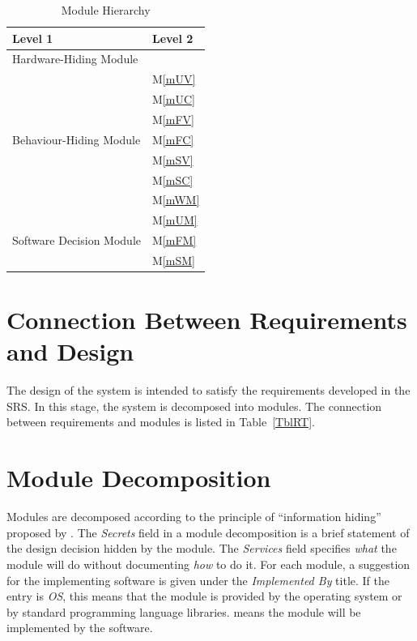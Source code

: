 \documentclass[12pt, titlepage]{article}
\newcommand{\mref}[1]{M\ref{#1}}
\begin{document}
\begin{table}[h!]
\centering
\begin{tabular}{p{} p{}}
\toprule
\textbf{Level 1} & \textbf{Level 2}\\
\midrule

{Hardware-Hiding Module} & ~ \\
\midrule

\multirow{7}{0.3\textwidth}{Behaviour-Hiding Module}
& \mref{mUV}\\
& \mref{mUC}\\
& \mref{mFV}\\
& \mref{mFC}\\
& \mref{mSV}\\
& \mref{mSC}\\ 
& \mref{mWM}\\
\midrule

\multirow{3}{0.3\textwidth}{Software Decision Module}
& \mref{mUM}\\
& \mref{mFM}\\
& \mref{mSM}\\
\bottomrule

\end{tabular}
\caption{Module Hierarchy}
\label{TblMH}
\end{table}

\section{Connection Between Requirements and Design} \label{SecConnection}

The design of the system is intended to satisfy the requirements developed in
the SRS. In this stage, the system is decomposed into modules. The connection
between requirements and modules is listed in Table~\ref{TblRT}.

\section{Module Decomposition} \label{SecMD}

Modules are decomposed according to the principle of ``information hiding''
proposed by \citet{ParnasEtAl1984}. The \emph{Secrets} field in a module
decomposition is a brief statement of the design decision hidden by the
module. The \emph{Services} field specifies \emph{what} the module will do
without documenting \emph{how} to do it. For each module, a suggestion for the
implementing software is given under the \emph{Implemented By} title. If the
entry is \emph{OS}, this means that the module is provided by the operating
system or by standard programming language libraries.  \emph{\progname{}} means the
module will be implemented by the \progname{} software.
\end{document}
